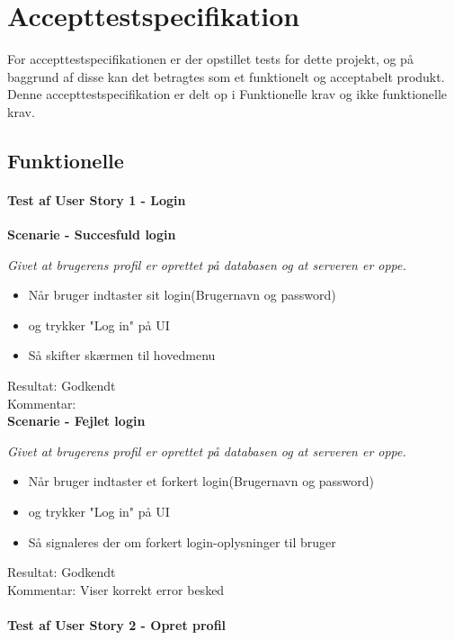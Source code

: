 \section{Accepttestspecifikation}
For accepttestspecifikationen er der opstillet tests for dette projekt, og på baggrund af disse kan det betragtes som et funktionelt og acceptabelt produkt. Denne accepttestspecifikation er delt op i Funktionelle krav og ikke funktionelle krav.

\subsection{Funktionelle}
\paragraph{Test af User Story 1 - Login}

\textbf{Scenarie - Succesfuld login}

\textit{Givet at brugerens profil er oprettet på databasen og at serveren er oppe.}

\begin{itemize}
  \item Når bruger indtaster sit login(Brugernavn og password)
  \item og trykker "Log in" på UI
  \item Så skifter skærmen til hovedmenu
\end{itemize}

Resultat: Godkendt\\
Kommentar:\\

\textbf{Scenarie - Fejlet login}

\textit{Givet at brugerens profil er oprettet på databasen og at serveren er oppe.}

\begin{itemize}
  \item Når bruger indtaster et forkert login(Brugernavn og password)
  \item og trykker "Log in" på UI
  \item Så signaleres der om forkert login-oplysninger til bruger
\end{itemize}

Resultat: Godkendt\\
Kommentar: Viser korrekt error besked\\

\paragraph{Test af User Story 2 - Opret profil}

